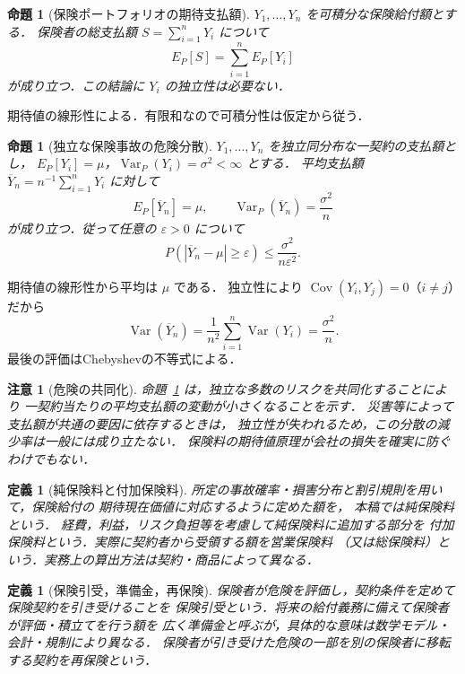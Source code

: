 \documentclass[a5paper,10pt,onecolumn]{jsarticle}
\makeatletter
\theoremstyle{mathnotetheorem}
\newtheorem{definition}[theorem]{定義}
\newtheorem{proposition}[theorem]{命題}
\newtheorem{remark}[theorem]{注意}
\renewcommand{\proofname}{証明}
\renewenvironment{proof}[1][\proofname]{%
  \par\pushQED{\qed}\normalfont\topsep4\p@\@plus2\p@\relax
  \trivlist\item[\hskip\labelsep\bfseries #1]\ignorespaces
}{\popQED\endtrivlist\@endpefalse}
\makeatother
\begin{document}
\begin{proposition}[保険ポートフォリオの期待支払額]\label{prop:insadd}
$Y_1,\ldots,Y_n$ を可積分な保険給付額とする．
保険者の総支払額 $S=\sum_{i=1}^n Y_i$ について
\[
 E_P[S]=\sum_{i=1}^n E_P[Y_i]
\]
が成り立つ．この結論に $Y_i$ の独立性は必要ない．
\end{proposition}
\begin{proof}
期待値の線形性による．有限和なので可積分性は仮定から従う．\end{proof}

\begin{proposition}[独立な保険事故の危険分散]\label{prop:pooling}
$Y_1,\ldots,Y_n$ を独立同分布な一契約の支払額とし，
$E_P[Y_i]=\mu$，$\operatorname{Var}_P(Y_i)=\sigma^2<\infty$ とする．
平均支払額 $\overline Y_n=n^{-1}\sum_{i=1}^nY_i$ に対して
\[
 E_P[\overline Y_n]=\mu,\qquad
 \operatorname{Var}_P(\overline Y_n)=\frac{\sigma^2}{n}
\]
が成り立つ．従って任意の $\varepsilon>0$ について
\[
 P(|\overline Y_n-\mu|\ge\varepsilon)
 \le\frac{\sigma^2}{n\varepsilon^2}.
\]
\end{proposition}
\begin{proof}
期待値の線形性から平均は $\mu$ である．
独立性により $\operatorname{Cov}(Y_i,Y_j)=0$（$i\ne j$）だから
\[
 \operatorname{Var}(\overline Y_n)
 =\frac1{n^2}\sum_{i=1}^n\operatorname{Var}(Y_i)
 =\frac{\sigma^2}{n}.
\]
最後の評価はChebyshevの不等式による．\end{proof}

\begin{remark}[危険の共同化]
命題~\ref{prop:pooling} は，独立な多数のリスクを共同化することにより
一契約当たりの平均支払額の変動が小さくなることを示す．
災害等によって支払額が共通の要因に依存するときは，
独立性が失われるため，この分散の減少率は一般には成り立たない．
保険料の期待値原理が会社の損失を確実に防ぐわけでもない．
\end{remark}

\begin{definition}[純保険料と付加保険料]
所定の事故確率・損害分布と割引規則を用いて，保険給付の
\emph{期待現在価値}に対応するように定めた額を，
本稿では\emph{純保険料}という．
経費，利益，リスク負担等を考慮して純保険料に追加する部分を
\emph{付加保険料}という．実際に契約者から受領する額を\emph{営業保険料}
（又は総保険料）という．実務上の算出方法は契約・商品によって異なる．
\end{definition}

\begin{definition}[保険引受，準備金，再保険]
保険者が危険を評価し，契約条件を定めて保険契約を引き受けることを
\emph{保険引受}という．将来の給付義務に備えて保険者が評価・積立てを行う額を
広く\emph{準備金}と呼ぶが，具体的な意味は数学モデル・会計・規制により異なる．
保険者が引き受けた危険の一部を別の保険者に移転する契約を\emph{再保険}という．
\end{definition}
\end{document}
